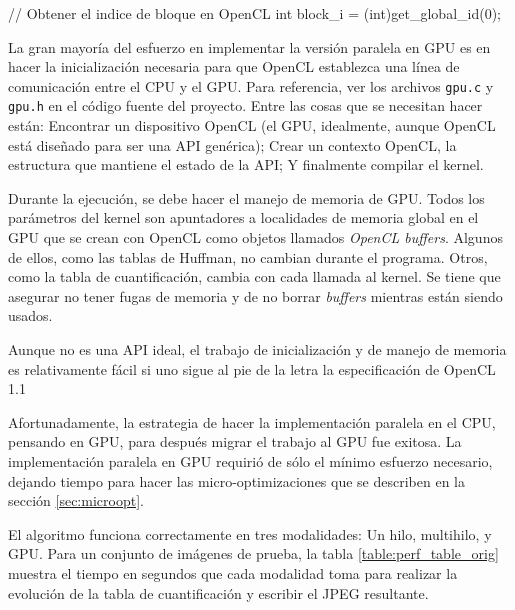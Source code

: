 \begin{code}[language=C][h]
    // Obtener el indice de bloque en OpenCL
    int block_i = (int)get_global_id(0);
\end{code}
{
La gran mayoría del esfuerzo en implementar la versión paralela en GPU es en
hacer la inicialización necesaria para que OpenCL establezca una línea de
comunicación entre el CPU y el GPU. Para referencia, ver los archivos
\verb+gpu.c+ y \verb+gpu.h+ en el código fuente del proyecto. Entre las cosas
que se necesitan hacer están: Encontrar un dispositivo OpenCL (el GPU,
idealmente, aunque OpenCL está diseñado para ser una API genérica); Crear un
contexto OpenCL, la estructura que mantiene el estado de la API; Y finalmente
compilar el kernel.

Durante la ejecución, se debe hacer el manejo de memoria de GPU. Todos los
parámetros del kernel son apuntadores a localidades de memoria global en el GPU
que se crean con OpenCL como objetos llamados \emph{OpenCL buffers}. Algunos de
ellos, como las tablas de Huffman, no cambian durante el programa. Otros, como
la tabla de cuantificación, cambia con cada llamada al kernel. Se tiene que
asegurar no tener fugas de memoria y de no borrar \emph{buffers} mientras están
siendo usados.

Aunque no es una API ideal, el trabajo de inicialización y de manejo de memoria
es relativamente fácil si uno sigue al pie de la letra la especificación de
OpenCL 1.1 \cite{opencl-spec}

Afortunadamente, la estrategia de hacer la implementación paralela en el CPU,
pensando en GPU, para después migrar el trabajo al GPU fue exitosa. La
implementación paralela en GPU requirió de sólo el mínimo esfuerzo necesario,
dejando tiempo para hacer las micro-optimizaciones que se describen en la
sección \ref{sec:microopt}.

El algoritmo funciona correctamente en tres modalidades: Un hilo, multihilo, y GPU. Para un conjunto de imágenes de prueba, la tabla
\ref{table:perf_table_orig} muestra el tiempo en segundos que cada modalidad toma
para realizar la evolución de la tabla de cuantificación y escribir el JPEG
resultante.


}
